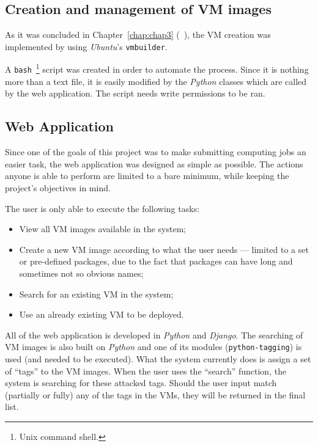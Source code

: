 \subsection{Creation and management of VM images}\label{subsec:vm-create-manage}

As it was concluded in Chapter~\ref{chap:chap3} (~), the VM creation was implemented by using \textit{Ubuntu}'s \texttt{vmbuilder}. 

A \texttt{bash}~\footnote{Unix command shell.} script was created in order to automate the process. Since it is nothing more than a text file, it is easily modified by the \textit{Python} classes which are called by the web application. The script needs write permissions to be ran.


\subsection{Web Application}\label{subsec:webapp}

Since one of the goals of this project was to make submitting computing jobs an easier task, the web application was designed as simple as possible. The actions anyone is able to perform are limited to a bare minimum, while keeping the project's objectives in mind.

The user is only able to execute the following tasks:

\begin{itemize}
\item View all VM images available in the system;
\item Create a new VM image according to what the user needs --- limited to a set or pre-defined packages, due to the fact that packages can have long and sometimes not so obvious names;
\item Search for an existing VM in the system;
\item Use an already existing VM to be deployed.
\end{itemize}

All of the web application is developed in \textit{Python} and \textit{Django}. The searching of VM images is also built on \textit{Python} and one of its modules (\texttt{python-tagging}) is used (and needed to be executed). What the system currently does is assign a set of ``tags'' to the VM images. When the user uses the ``search'' function, the system is searching for these attacked tags. Should the user input match (partially or fully) any of the tags in the VMs, they will be returned in the final list.






